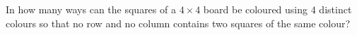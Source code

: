 In how many ways can the squares of a $4\times4$ board be coloured using $4$ distinct colours so that no row and no column contains two squares of the same colour?
